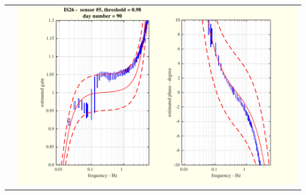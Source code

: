 \documentclass[handout,10pt]{beamer}
\begin{document}
\begin{frame}
\begin{tabular}{cc}
&
\includegraphics[scale=0.25]{3monthsonIS26SUTboxplot5-eps-converted-to.pdf}
\end{tabular}
\end{frame}
%
%
%
%
%
%
%
%
%
\end{document}
